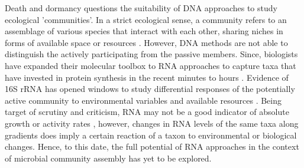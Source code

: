 \documentclass[12pt,a4paper]{article} %
\begin{document}
Death and dormancy \citep{Cole1999, Jones2010} questions the suitability of DNA approaches to study ecological 'communities'. In a strict ecological sense, a community refers to an assemblage of various species that interact with each other, sharing niches in forms of available space or resources \citep{Konopka2009}. However, DNA methods are not able to distinguish the actively participating from the passive members. Since, biologists have expanded their molecular toolbox to RNA approaches to capture taxa that have invested in protein synthesis in the recent minutes to hours \citep{Blazewicz2013}. Evidence of 16S rRNA has opened windows to study differential responses of the potentially active community to environmental variables \citep{Wiskonski2020} and available resources \citep{Osterholz2016}. Being target of scrutiny and criticism, RNA may not be a good indicator of absolute growth or activity rates \citep{Blazewicz2013}, however, changes in RNA levels of the same taxa along gradients does imply a certain reaction of a taxon to environmental or biological changes. Hence, to this date, the full potential of RNA approaches in the context of microbial community assembly has yet to be explored.
\end{document}
